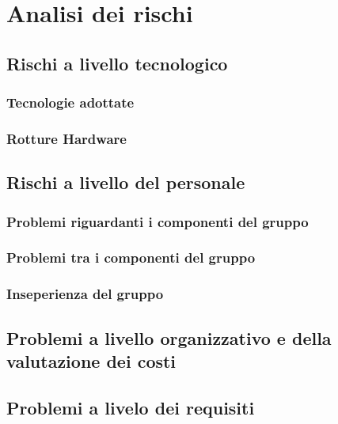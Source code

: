 \section{Analisi dei rischi}
\subsection{Rischi a livello tecnologico}
\subsubsection{Tecnologie adottate}
\subsubsection{Rotture Hardware}
\subsection{Rischi a livello del personale}
\subsubsection{Problemi riguardanti i componenti del gruppo}
\subsubsection{Problemi tra i componenti del gruppo}
\subsubsection{Inseperienza del gruppo}
\subsection{Problemi a livello organizzativo e della valutazione dei costi}
\subsection{Problemi a livelo dei requisiti}